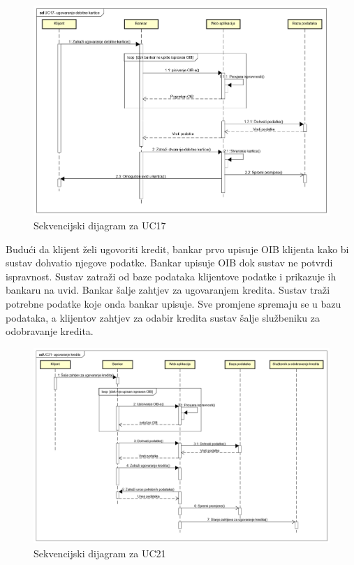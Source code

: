 			\begin{figure}[H]
				\includegraphics[scale=0.5]{slike/UC17- ugovaranje debitne kartice.PNG}
				\centering
				\caption{Sekvencijski dijagram za UC17}
				\label{fig:uc17}
			\end{figure}
			\eject
			
			
			
			Budući da klijent želi ugovoriti kredit, bankar prvo upisuje OIB klijenta kako bi sustav dohvatio njegove podatke. Bankar upisuje OIB dok sustav ne potvrdi ispravnost. Sustav zatraži od baze podataka klijentove podatke i prikazuje ih bankaru na uvid. Bankar šalje zahtjev za ugovaranjem kredita. Sustav traži potrebne podatke koje onda bankar upisuje. Sve promjene spremaju se u bazu podataka, a klijentov zahtjev za odabir kredita sustav šalje službeniku za odobravanje kredita.
			\eject
			
			\begin{figure}[H]
				\includegraphics[scale=0.43]{slike/UC21- ugovaranje kredita.PNG}
				\centering
				\caption{Sekvencijski dijagram za UC21}
				\label{fig:uc21}
			\end{figure}
			\eject
			
